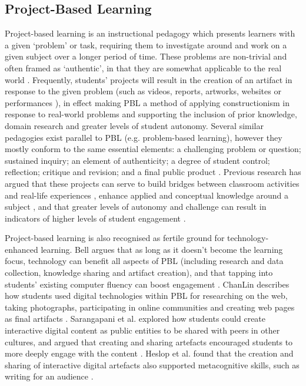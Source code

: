 \documentclass[,hyphens]{sigchi}
\begin{document}
\subsection{Project-Based Learning}
Project-based learning is an instructional pedagogy which presents learners with a given `problem' or task, requiring them to investigate around and work on a given subject over a longer period of time. These problems are non-trivial and often framed as `authentic', in that they are somewhat applicable to the real world \cite{Blumenfeld1991}. Frequently, students' projects will result in the creation of an artifact in response to the given problem (such as videos, reports, artworks, websites or performances \cite{Holubova2008}), in effect making PBL a method of applying constructionism in response to real-world problems and supporting the inclusion of prior knowledge, domain research and greater levels of student autonomy. Several similar pedagogies exist parallel to PBL (e.g. problem-based learning), however they mostly conform to the same essential elements: a challenging problem or question; sustained inquiry; an element of authenticity; a degree of student control; reflection; critique and revision; and a final public product \cite{Larmer2015}. Previous research has argued that these projects can serve to build bridges between classroom activities and real-life experiences \cite{Blumenfeld1991}, enhance applied and conceptual knowledge around a subject \cite{Boaler1999}, and that greater levels of autonomy and challenge can result in indicators of higher levels of student engagement \cite{Wurdinger2007}.

Project-based learning is also recognised as fertile ground for technology-enhanced learning. Bell argues that as long as it doesn't become the learning focus, technology can benefit all aspects of PBL (including research and data collection, knowledge sharing and artifact creation), and that tapping into students' existing computer fluency can boost engagement \cite{Bell2010}. ChanLin describes how students used digital technologies within PBL for researching on the web, taking photographs, participating in online communities and creating web pages as final artifacts \cite{ChanLin2008}. Sarangapani et al. explored how students could create interactive digital content as public entities to be shared with peers in other cultures, and argued that creating and sharing artefacts encouraged students to more deeply engage with the content \cite{Sarangapani2018}. Heslop et al. found that the creation and sharing of interactive digital artefacts also supported metacognitive skills, such as writing for an audience \cite{Heslop2017}. 
\end{document}

